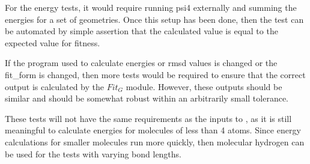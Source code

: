 \documentclass[12pt, titlepage]{article}
\begin{document}
For the energy tests, it would require running psi4 externally and summing the 
energies for a set of geometries. Once this setup has been done, then the test 
can be automated by simple assertion that the calculated value is equal to the 
expected value for fitness.

If the program used to calculate energies or rmsd values is changed or the 
fit\_form is changed, then more tests would be required to ensure that the 
correct output is calculated by the $Fit_G$ module. However, these outputs 
should be similar and should be somewhat robust within an arbitrarily small 
tolerance.

These tests will not have the same requirements as the inputs to \progname{}, 
as it is still meaningful to calculate energies for molecules of less than 4 
atoms. Since energy calculations for smaller molecules run more quickly, then 
molecular hydrogen can be used for the tests with varying bond lengths. 

\end{document}
